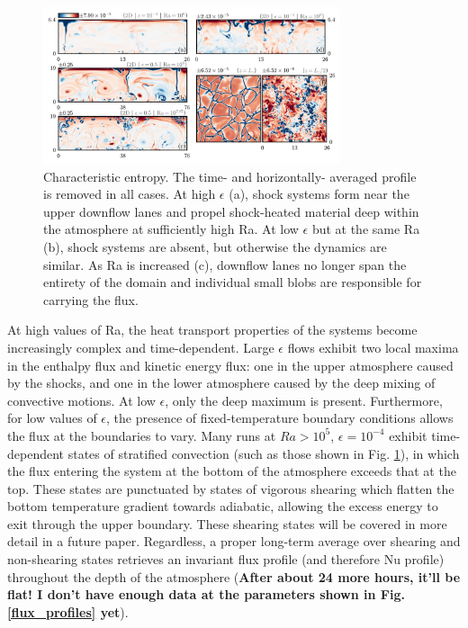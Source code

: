 \documentclass[aps, prl, twocolumn, groupedaddress, amsfonts, amssymb, amsmath]{revtex4-1}
\begin{document}
\begin{figure}[t]
\includegraphics[width=3.4375in]{./figs/snapshots_fig.png}
\caption{Characteristic entropy. The time- and horizontally-
averaged profile is removed in all cases.  At high
$\epsilon$ (a), shock systems form near the upper downflow lanes and propel shock-heated material deep within
the atmosphere at sufficiently high Ra.  At low $\epsilon$ but at the same Ra (b), shock systems are absent, 
but otherwise the dynamics are similar.  As Ra is increased (c), downflow lanes no longer span
the entirety of the domain and individual small blobs are responsible for carrying the flux.
\label{fig:entropy_snapshots} }
\end{figure}

At high values of Ra, the heat transport properties of the systems become increasingly complex and time-dependent.
Large $\epsilon$ flows exhibit two local maxima in the enthalpy flux and kinetic energy flux: one in the upper 
atmosphere caused by the shocks, and one in the lower atmosphere caused by the deep mixing of convective motions.
At low $\epsilon$, only the deep maximum is present.  Furthermore, for low values of $\epsilon$, the presence
of fixed-temperature boundary conditions allows the flux at the boundaries to vary.  Many runs at $Ra > 10^5$,
$\epsilon = 10^{-4}$ exhibit time-dependent states of stratified convection (such as those shown in 
Fig. \ref{fig:entropy_snapshots}), in which the flux entering the system at the bottom of the atmosphere exceeds
that at the top.  These states are punctuated by states of vigorous shearing which flatten the bottom temperature
gradient towards adiabatic, allowing the excess energy to exit through the upper boundary.  These shearing
states will be covered in more detail in a future paper.  Regardless, a proper long-term average over shearing
and non-shearing states retrieves an invariant flux profile (and therefore Nu profile) throughout the depth
of the atmosphere (\textbf{After about 24 more hours, it'll be flat!  I don't have enough data at the parameters
shown in Fig. \ref{flux_profiles} yet}).
\end{document}
